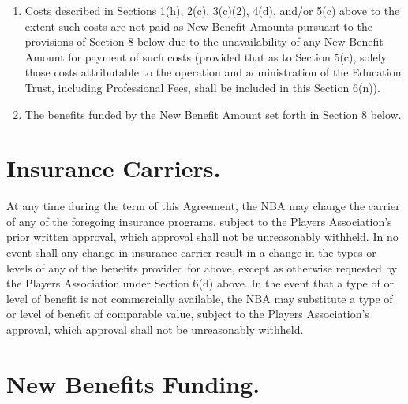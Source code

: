 \documentclass[
]{book}
\begin{document}
\begin{enumerate}
\item
  Costs described in Sections 1(h), 2(c), 3(c)(2), 4(d), and/or 5(c) above to the extent such costs are not paid as New Benefit Amounts pursuant to the provisions of Section 8 below due to the unavailability of any New Benefit Amount for payment of such costs (provided that as to Section 5(c), solely those costs attributable to the operation and administration of the Education Trust, including Professional Fees, shall be included in this Section 6(n)).
\item
  The benefits funded by the New Benefit Amount set forth in Section 8 below.
\end{enumerate}

\hypertarget{insurance-carriers.}{%
\section{Insurance Carriers.}\label{insurance-carriers.}}

At any time during the term of this Agreement, the NBA may change the carrier of any of the foregoing insurance programs, subject to the Players Association's prior written approval, which approval shall not be unreasonably withheld. In no event shall any change in insurance carrier result in a change in the types or levels of any of the benefits provided for above, except as otherwise requested by the Players Association under Section 6(d) above. In the event that a type of or level of benefit is not commercially available, the NBA may substitute a type of or level of benefit of comparable value, subject to the Players Association's approval, which approval shall not be unreasonably withheld.

\hypertarget{new-benefits-funding.}{%
\section{New Benefits Funding.}\label{new-benefits-funding.}}
\end{document}
